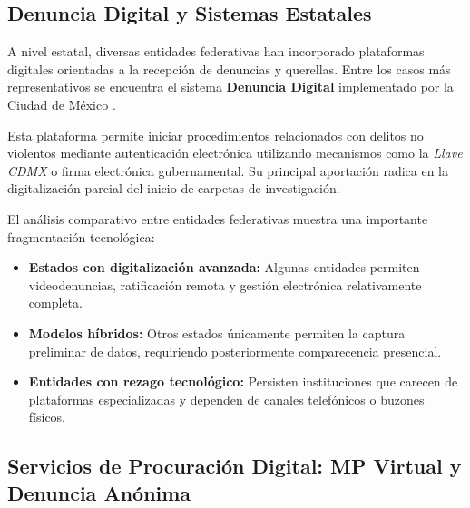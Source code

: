\subsection{Denuncia Digital y Sistemas Estatales}

\begin{flushleft}
\justifying

A nivel estatal, diversas entidades federativas han incorporado plataformas digitales orientadas a la recepción de denuncias y querellas. Entre los casos más representativos se encuentra el sistema \textbf{Denuncia Digital} implementado por la Ciudad de México \cite{9}.

Esta plataforma permite iniciar procedimientos relacionados con delitos no violentos mediante autenticación electrónica utilizando mecanismos como la \textit{Llave CDMX} o firma electrónica gubernamental. Su principal aportación radica en la digitalización parcial del inicio de carpetas de investigación.

El análisis comparativo entre entidades federativas muestra una importante fragmentación tecnológica:

\begin{itemize}

    \item \textbf{Estados con digitalización avanzada:}
    Algunas entidades permiten videodenuncias, ratificación remota y gestión electrónica relativamente completa.

    \item \textbf{Modelos híbridos:}
    Otros estados únicamente permiten la captura preliminar de datos, requiriendo posteriormente comparecencia presencial.

    \item \textbf{Entidades con rezago tecnológico:}
    Persisten instituciones que carecen de plataformas especializadas y dependen de canales telefónicos o buzones físicos.

\end{itemize}

\end{flushleft}


\subsection{Servicios de Procuración Digital: MP Virtual y Denuncia Anónima}

